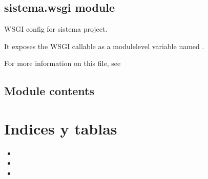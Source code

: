 \documentclass[letterpaper,10pt,spanish]{sphinxmanual}
\begin{document}
\section{sistema.wsgi module}
\label{\detokenize{modules/sistema:module-sistema.wsgi}}\label{\detokenize{modules/sistema:sistema-wsgi-module}}
\sphinxAtStartPar
WSGI config for sistema project.

\sphinxAtStartPar
It exposes the WSGI callable as a module\sphinxhyphen{}level variable named .

\sphinxAtStartPar
For more information on this file, see


\section{Module contents}
\label{\detokenize{modules/sistema:module-sistema}}\label{\detokenize{modules/sistema:module-contents}}

\chapter{Indices y tablas}
\label{\detokenize{index:indices-y-tablas}}\begin{itemize}
\item {} 
\sphinxAtStartPar
{}

\item {} 
\sphinxAtStartPar
{}

\item {} 
\sphinxAtStartPar
{}

\end{itemize}
\end{document}

